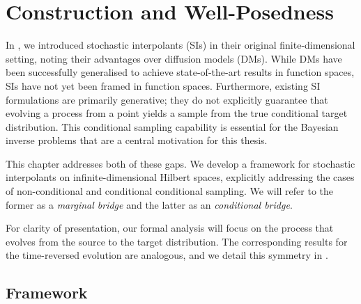 \chapter{Construction and Well-Posedness}\label{cha:3}

\ifpdf
\graphicspath{{Chapter3/Figs/Raster/}{Chapter3/Figs/PDF/}{Chapter3/Figs/}}
\else
\graphicspath{{Chapter3/Figs/Vector/}{Chapter3/Figs/}}
\fi

In , we introduced stochastic interpolants (SIs) in their original finite-dimensional setting, noting their advantages over diffusion models (DMs). %
While DMs have been successfully generalised to achieve state-of-the-art results in function spaces, SIs have not yet been framed in function spaces. Furthermore, existing SI formulations are primarily generative; they do not explicitly guarantee that evolving a process from a point yields a sample from the true conditional target distribution. This conditional sampling capability is essential for the Bayesian inverse problems that are a central motivation for this thesis.

This chapter addresses both of these gaps. We develop a framework for stochastic interpolants on infinite-dimensional Hilbert spaces, explicitly addressing the cases of non-conditional and conditional conditional sampling. We will refer to the former as a \textit{marginal bridge} and the latter as an \textit{conditional bridge}.

For clarity of presentation, our formal analysis will focus on the process that evolves from the source to the target distribution. The corresponding results for the time-reversed evolution are analogous, and we detail this symmetry in . %


\section{Framework}


